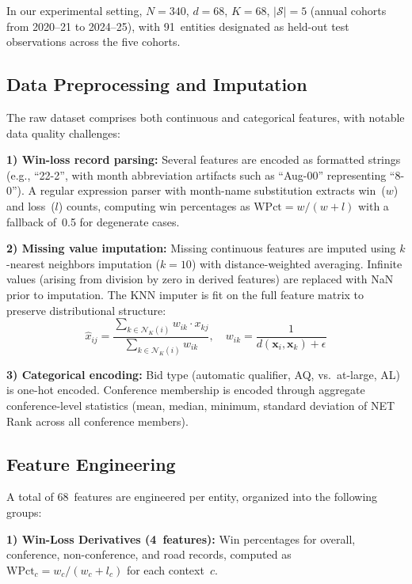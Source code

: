 \documentclass[conference]{IEEEtran}
\begin{document}
In our experimental setting, $N = 340$, $d = 68$, $K = 68$, $|\mathcal{S}| = 5$ (annual cohorts from 2020--21 to 2024--25), with 91~entities designated as held-out test observations across the five cohorts.

\subsection{Data Preprocessing and Imputation}

The raw dataset comprises both continuous and categorical features, with notable data quality challenges:

\textbf{1) Win-loss record parsing:} Several features are encoded as formatted strings (e.g., ``22-2'', with month abbreviation artifacts such as ``Aug-00'' representing ``8-0''). A regular expression parser with month-name substitution extracts win~($w$) and loss~($l$) counts, computing win percentages as $\text{WPct} = w / (w + l)$ with a fallback of~0.5 for degenerate cases.

\textbf{2) Missing value imputation:} Missing continuous features are imputed using $k$-nearest neighbors imputation ($k = 10$) with distance-weighted averaging. Infinite values (arising from division by zero in derived features) are replaced with NaN prior to imputation. The KNN imputer is fit on the full feature matrix to preserve distributional structure:
\begin{equation}
\hat{x}_{ij} = \frac{\displaystyle\sum_{k \in \mathcal{N}_K(i)} w_{ik} \cdot x_{kj}}{\displaystyle\sum_{k \in \mathcal{N}_K(i)} w_{ik}},\quad w_{ik} = \frac{1}{d(\mathbf{x}_i, \mathbf{x}_k) + \epsilon}
\label{eq:knn_impute}
\end{equation}

\textbf{3) Categorical encoding:} Bid type (automatic qualifier, AQ, vs.\ at-large, AL) is one-hot encoded. Conference membership is encoded through aggregate conference-level statistics (mean, median, minimum, standard deviation of NET Rank across all conference members).

\subsection{Feature Engineering}

A total of 68~features are engineered per entity, organized into the following groups:

\textbf{1) Win-Loss Derivatives (4~features):} Win percentages for overall, conference, non-conference, and road records, computed as $\text{WPct}_c = w_c / (w_c + l_c)$ for each context~$c$.
\end{document}
